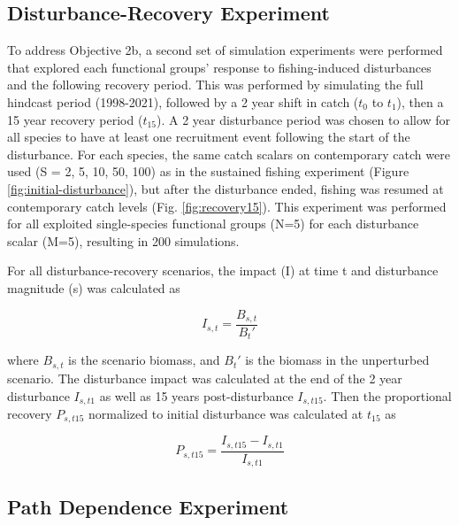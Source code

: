 \documentclass[
]{article}
\begin{document}
\subsection{Disturbance-Recovery Experiment}\label{disturbance-recovery-experiment}

To address Objective 2b, a second set of simulation experiments were performed that explored each functional groups' response to fishing-induced disturbances and the following recovery period. This was performed by simulating the full hindcast period (1998-2021), followed by a 2 year shift in catch (\(t_0\) to \(t_1\)), then a 15 year recovery period (\(t_15\)). A 2 year disturbance period was chosen to allow for all species to have at least one recruitment event following the start of the disturbance. For each species, the same catch scalars on contemporary catch were used (S = 2, 5, 10, 50, 100) as in the sustained fishing experiment (Figure \ref{fig:initial-disturbance}), but after the disturbance ended, fishing was resumed at contemporary catch levels (Fig. \ref{fig:recovery15}). This experiment was performed for all exploited single-species functional groups (N=5) for each disturbance scalar (M=5), resulting in 200 simulations.

For all disturbance-recovery scenarios, the impact (I) at time t and disturbance magnitude (s) was calculated as

\begin{equation}
  I_{s,t} = \frac{B_{s,t}}{B_{t}'}
  \label{eq:impact}
\end{equation}

where \(B_{s,t}\) is the scenario biomass, and \(B_{t}'\) is the biomass in the unperturbed scenario. The disturbance impact was calculated at the end of the 2 year disturbance \(I_{s,t1}\) as well as 15 years post-disturbance \(I_{s,t15}\). Then the proportional recovery \(P_{s,t15}\) normalized to initial disturbance was calculated at \(t_{15}\) as

\begin{equation}
  P_{s,t15} = \frac{I_{s,t15} - I_{s,t1}}{I_{s,t1}}
  \label{eq:recovery-prop}
\end{equation}

\subsection{Path Dependence Experiment}\label{path-dependence-experiment}
\end{document}
